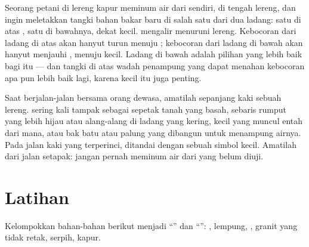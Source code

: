 \begin{example}\label{ex:g6:water-underground:tank}
Seorang petani di lereng  kapur meminum air dari  sendiri, di
tengah lereng, dan ingin meletakkan tangki bahan bakar baru di salah satu
dari dua ladang: satu di atas , satu di bawahnya, dekat  kecil.
 mengalir menuruni lereng. Kebocoran dari ladang di atas akan
hanyut turun menuju ; kebocoran dari ladang di bawah akan hanyut
menjauhi , menuju  kecil. Ladang di bawah  adalah pilihan
yang lebih baik bagi  itu --- dan tangki di atas wadah penampung yang
dapat menahan kebocoran apa pun lebih baik lagi, karena  kecil itu
juga penting.
\end{example}

\begin{inthefield}
Saat berjalan-jalan bersama orang dewasa, amatilah sepanjang kaki sebuah
lereng.  sering kali tampak sebagai sepetak tanah yang basah, sebaris
rumput yang lebih hijau atau alang-alang di ladang yang kering,  kecil
yang muncul entah dari mana, atau bak batu atau palung yang dibangun untuk
menampung airnya. Pada  jalan kaki yang terperinci,  ditandai
dengan sebuah simbol kecil. Amatilah dari jalan setapak: jangan pernah
meminum air dari  yang belum diuji.
\end{inthefield}

\section{Latihan}

\begin{exercise}[$\star$]\label{exo:g6:water-underground:1}
Kelompokkan bahan-bahan berikut menjadi ``'' dan ``'':
, lempung, , granit yang tidak retak, serpih, kapur.
\end{exercise}

